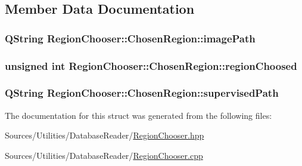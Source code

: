 \subsection{Member Data Documentation}
\hypertarget{struct_region_chooser_1_1_chosen_region_a91c6ae294970a8beb4809fe84caa9cd9}{
\subsubsection[{image\+Path}]{\setlength{\rightskip}{0pt plus 5cm}Q\+String Region\+Chooser\+::\+Chosen\+Region\+::image\+Path}}\label{struct_region_chooser_1_1_chosen_region_a91c6ae294970a8beb4809fe84caa9cd9}
\hypertarget{struct_region_chooser_1_1_chosen_region_aa84ca6499d84eeb7637e264ad6566f53}{
\subsubsection[{region\+Choosed}]{\setlength{\rightskip}{0pt plus 5cm}unsigned int Region\+Chooser\+::\+Chosen\+Region\+::region\+Choosed}}\label{struct_region_chooser_1_1_chosen_region_aa84ca6499d84eeb7637e264ad6566f53}
\hypertarget{struct_region_chooser_1_1_chosen_region_aa9c09ac80e8b0f17b172f11d7040e1d7}{
\subsubsection[{supervised\+Path}]{\setlength{\rightskip}{0pt plus 5cm}Q\+String Region\+Chooser\+::\+Chosen\+Region\+::supervised\+Path}}\label{struct_region_chooser_1_1_chosen_region_aa9c09ac80e8b0f17b172f11d7040e1d7}


The documentation for this struct was generated from the following files\+:\begin{DoxyCompactItemize}
\item 
Sources/\+Utilities/\+Database\+Reader/\hyperlink{_region_chooser_8hpp}{Region\+Chooser.\+hpp}\item 
Sources/\+Utilities/\+Database\+Reader/\hyperlink{_region_chooser_8cpp}{Region\+Chooser.\+cpp}\end{DoxyCompactItemize}
